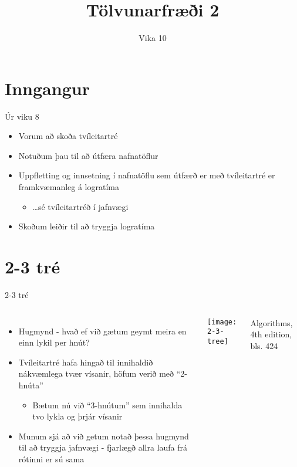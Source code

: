 \documentclass{beamer}
\title{Tölvunarfræði 2}
\subtitle{Vika 10}
\begin{document}
\begin{frame}
	\titlepage
\end{frame}

\section{Inngangur}

\begin{frame}{Úr viku 8}
	\begin{itemize}
		\item Vorum að skoða tvíleitartré 
		\item Notuðum þau til að útfæra nafnatöflur 
		\item Uppfletting og innsetning í nafnatöflu sem útfærð er með tvíleitartré er framkvæmanleg á logratíma
		      \begin{itemize}
			      \item \ldots sé tvíleitartréð í jafnvægi
		      \end{itemize}
		\item Skoðum leiðir til að tryggja logratíma
	\end{itemize}
\end{frame}


\section{2-3 tré}

\begin{frame}{2-3 tré}
	\begin{columns}
		\begin{itemize}
			\item Hugmynd - hvað ef við gætum geymt meira en einn lykil per hnút?
			\item Tvíleitartré hafa hingað til innihaldið nákvæmlega tvær vísanir, höfum verið með ``2-hnúta''
			      \begin{itemize}
				      \item Bætum nú við ``3-hnútum'' sem innihalda tvo lykla og þrjár vísanir
			      \end{itemize}
			\item Munum sjá að við getum notað þessa hugmynd til að tryggja jafnvægi - fjarlægð allra laufa frá rótinni er sú sama
		\end{itemize}
		\texttt{[image: 2-3-tree]}

		Algorithms, 4th edition, bls. 424
	\end{columns}
\end{frame}
\end{document}
